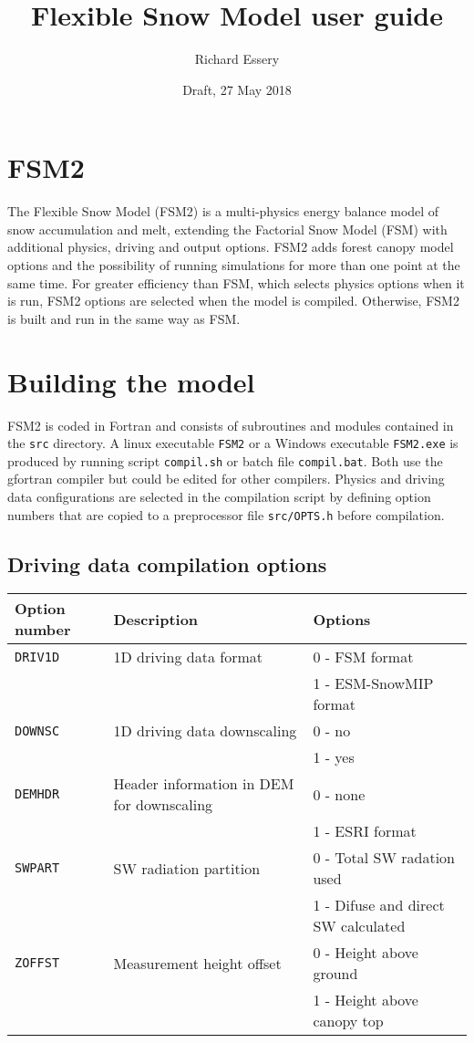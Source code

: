 \documentclass{article}
\title{Flexible Snow Model user guide}
\author{Richard Essery}
\date{Draft, 27 May 2018}
\begin{document}
\maketitle
\parindent0pt

\section{FSM2}

The Flexible Snow Model (FSM2) is a multi-physics energy balance model of snow accumulation and melt, extending the Factorial Snow Model (FSM) with additional physics, driving and output options. FSM2 adds forest canopy model options and the possibility of running simulations for more than one point at the same time. For greater efficiency than FSM, which selects physics options when it is run, FSM2 options are selected when the model is compiled. Otherwise, FSM2 is built and run in the same way as FSM.

\section{Building the model}

FSM2 is coded in Fortran and consists of subroutines and modules contained in the {\tt src} directory. A linux executable {\tt FSM2} or a Windows executable {\tt FSM2.exe} is produced by running script {\tt compil.sh} or batch file {\tt compil.bat}. Both use the gfortran compiler but could be edited for other compilers. Physics and driving data configurations are selected in the compilation script by defining option numbers that are copied to a preprocessor file {\tt src/OPTS.h} before compilation.

\subsection*{Driving data compilation options }
\begin{tabular}{|l|l|l|}
\hline
Option number & Description & Options \\
\hline
{\tt DRIV1D} & 1D driving data format
& 0 - FSM format \\
& & 1 - ESM-SnowMIP format \\
\hline
{\tt DOWNSC} & 1D driving data downscaling
& 0 - no \\
& & 1 - yes \\
\hline
{\tt DEMHDR} & Header information in DEM for downscaling
& 0 - none \\
& & 1 - ESRI format \\
\hline
{\tt SWPART} & SW radiation partition
& 0 - Total SW radation used \\
& & 1 - Difuse and direct SW calculated \\
\hline
{\tt ZOFFST} & Measurement height offset
& 0 - Height above ground \\
& & 1 - Height above canopy top \\
\hline
\end{tabular}
\end{document}
